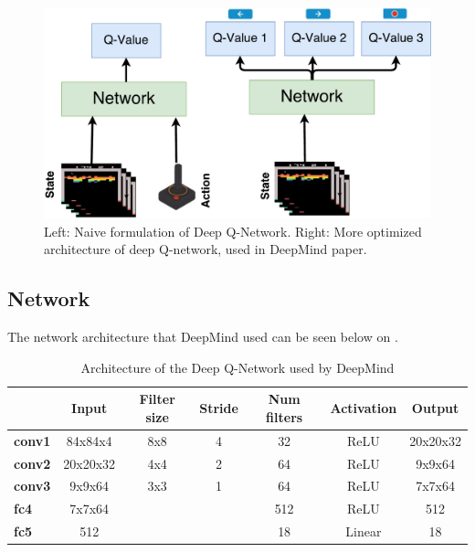 \begin{figure}[H]
	\centering
	\includegraphics[width=1\textwidth]{Figures/Architecture/DQN/DQN_two_approach.pdf}
	\caption{Left: Naive formulation of Deep Q-Network. Right: More optimized architecture of deep Q-network, used in DeepMind paper.} 
	\label{fig:DQN_two_approach}
\end{figure}    

\subsection{Network}
The network architecture that DeepMind used can be seen below on .

\begin{table}[H]
	\centering
	\caption{Architecture of the Deep Q-Network used by DeepMind}
	\label{tab:DQN_network}
	\begin{tabular}{|l|c|c|c|c|c|c|}
		\hline
		\rowcolor[HTML]{9B9B9B} 
		\multicolumn{1}{|c|}{\cellcolor[HTML]{9B9B9B}\textbf{Layer}} & \textbf{Input} & \textbf{Filter size} & \textbf{Stride} & \textbf{Num filters} & \textbf{Activation} & \textbf{Output} \\ \hline
		\cellcolor[HTML]{FFFFFF}\textbf{conv1}                       & 84x84x4        & 8x8                  & 4               & 32                   & ReLU                & 20x20x32        \\ \hline
		\rowcolor[HTML]{C0C0C0} 
		\textbf{conv2}                                               & 20x20x32       & 4x4                  & 2               & 64                   & ReLU                & 9x9x64          \\ \hline
		\cellcolor[HTML]{FFFFFF}\textbf{conv3}                       & 9x9x64         & 3x3                  & 1               & 64                   & ReLU                & 7x7x64          \\ \hline
		\rowcolor[HTML]{C0C0C0} 
		\textbf{fc4}                                                 & 7x7x64         &                      &                 & 512                  & ReLU                & 512             \\ \hline
		\cellcolor[HTML]{FFFFFF}\textbf{fc5}                         & 512            &                      &                 & 18                   & Linear              & 18              \\ \hline
	\end{tabular}
\end{table}

